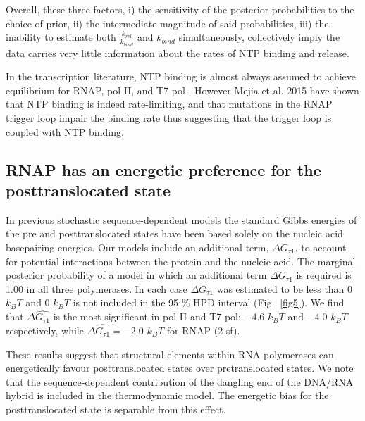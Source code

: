 \documentclass[10pt,letterpaper]{article}
\begin{document}
Overall, these three factors, i) the sensitivity of the posterior probabilities to the choice of prior, ii) the intermediate magnitude of said probabilities, iii) the inability to estimate both $\frac{k_{rel}}{k_{bind}}$ and $k_{bind}$ simultaneously, collectively imply the data carries very little information about the rates of NTP binding and release.




In the transcription literature, NTP binding is almost always assumed to achieve equilibrium for RNAP, pol II, and T7 pol \cite{maoileidigh2011unified, tadigotla2006thermodynamic, bai2004sequence, abbondanzieri2005direct, larson2012trigger, schweikhard2014transcription, Dangkulwanich2013complete, arnold2001kinetic, thomen2008t7, thomen2005unravelling}. However Mejia et al. 2015 \cite{mejia2015trigger} have shown that NTP binding is indeed rate-limiting, and that mutations in the RNAP trigger loop impair the binding rate thus suggesting that the trigger loop is coupled with NTP binding. \par   





\subsection*{RNAP has an energetic preference for the posttranslocated state}
In previous stochastic sequence-dependent models \cite{bai2004sequence, tadigotla2006thermodynamic} the standard Gibbs energies of the pre and posttranslocated states have been based solely on the nucleic acid  basepairing energies. Our models include an additional term, $\Delta G_{\tau 1}$, to account for potential interactions between the protein and the nucleic acid. The marginal posterior probability of a model in which an additional term $\Delta G_{\tau 1}$ is required is 1.00 in all three polymerases. In each case $\Delta G_{\tau 1}$ was estimated to be less than 0 $k_BT$ and 0 $k_BT$ is not included in the 95 \% HPD interval (Fig ~\ref{fig5}). We find that $\Delta \hat{G_{\tau 1}}$ is the most significant in pol II and T7 pol: $-4.6$ $k_BT$  and $-4.0$ $k_BT$ respectively,  while $\Delta \hat{G_{\tau 1}} = -2.0$ $k_BT$ for RNAP (2 sf). \par

These results suggest that structural elements within RNA polymerases can energetically favour posttranslocated states over pretranslocated states. We note that the sequence-dependent contribution of the dangling end of the DNA/RNA hybrid is included in the thermodynamic model. The energetic bias for the posttranslocated state is separable from this effect.  \par
\end{document}
